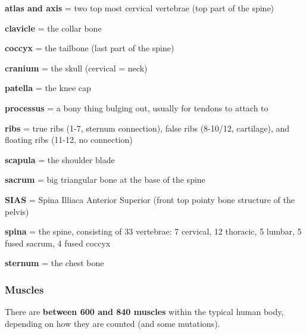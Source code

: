 \begin{itemize*}
    \item \textbf{atlas and axis} = two top most cervical vertebrae (top part of the spine)
    \item \textbf{clavicle} = the collar bone
    \item \textbf{coccyx} = the tailbone (last part of the spine)
    \item \textbf{cranium} = the skull (cervical = neck)
    \item \textbf{patella} = the knee cap
    \item \textbf{processus} = a bony thing bulging out, usually for tendons to attach to
    \item \textbf{ribs} = true ribs (1-7, sternum connection), false ribs (8-10/12, cartilage), and floating ribs (11-12, no connection)
    \item \textbf{scapula} = the shoulder blade
    \item \textbf{sacrum} = big triangular bone at the base of the spine
    \item \textbf{SIAS} = Spina Illiaca Anterior Superior (front top pointy bone structure of the pelvis)
    \item \textbf{spina} = the spine, consisting of 33 vertebrae: 7 cervical, 12 thoracic, 5 lumbar, 5 fused sacrum, 4 fused coccyx
    \item \textbf{sternum} = the chest bone
\end{itemize*}

\subsubsection{Muscles}

There are \textbf{between 600 and 840 muscles} within the typical human body, depending on how they are counted (and some mutations).

